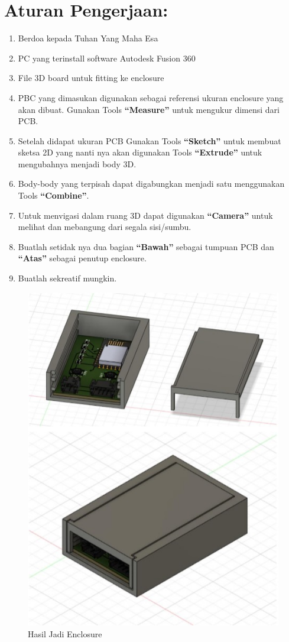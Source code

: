 \section{Aturan Pengerjaan:}
\begin{enumerate}
    \item Berdoa kepada Tuhan Yang Maha Esa
    \item PC yang terinstall software Autodesk Fusion 360
    \item File 3D board untuk fitting ke enclosure
    \item PBC yang dimasukan digunakan sebagai referensi ukuran enclosure yang akan dibuat. Gunakan
    Tools \textbf{“Measure”} untuk mengukur dimensi dari PCB.
    \item Setelah didapat ukuran PCB Gunakan Tools \textbf{“Sketch”} untuk membuat sketsa 2D yang nanti nya
    akan digunakan Tools \textbf{“Extrude”} untuk mengubahnya menjadi body 3D.
    \item Body-body yang terpisah dapat digabungkan menjadi satu menggunakan Tools \textbf{“Combine”}.
    \item Untuk menvigasi dalam ruang 3D dapat digunakan \textbf{“Camera”} untuk melihat dan mebangung
    dari segala sisi/sumbu.
    \item Buatlah setidak nya dua bagian \textbf{“Bawah”} sebagai tumpuan PCB dan \textbf{“Atas”} sebagai penutup
    enclosure.
    \item Buatlah sekreatif mungkin.
\end{enumerate}

\begin{figure}[H]
    \centering
    \includegraphics[width=0.6\linewidth]{P3/img/image11.jpg}
    \caption{Hasil Jadi Enclosure}
    \label{fig:Hasil Jadi Enclosure}
\end{figure}